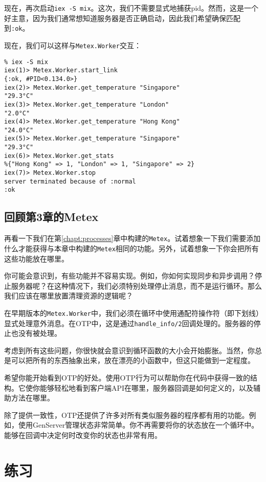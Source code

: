 现在，再次启动\texttt{iex -S mix}。这次，我们不需要显式地捕获pid。然而，这是一个好主意，因为我们通常想知道服务器是否正确启动，因此我们希望确保匹配到\texttt{:ok}。

现在，我们可以这样与\texttt{Metex.Worker}交互：

\begin{code}{}
\begin{verbatim}
% iex -S mix
iex(1)> Metex.Worker.start_link
{:ok, #PID<0.134.0>}
iex(2)> Metex.Worker.get_temperature "Singapore"
"29.3°C"
iex(3)> Metex.Worker.get_temperature "London"
"2.0°C"
iex(4)> Metex.Worker.get_temperature "Hong Kong"
"24.0°C"
iex(5)> Metex.Worker.get_temperature "Singapore"
"29.3°C"
iex(6)> Metex.Worker.get_stats
%{"Hong Kong" => 1, "London" => 1, "Singapore" => 2}
iex(7)> Metex.Worker.stop
server terminated because of :normal
:ok
\end{verbatim}
\end{code}


\subsection{回顾第3章的Metex}

再看一下我们在第\ref{chapt:processes}章中构建的\texttt{Metex}。试着想象一下我们需要添加什么才能获得与本章中构建的\texttt{Metex}相同的功能。另外，试着想象一下你会把所有这些功能放在哪里。

你可能会意识到，有些功能并不容易实现。例如，你如何实现同步和异步调用？停止服务器呢？在这种情况下，我们必须特别处理停止消息，而不是运行循环。那么我们应该在哪里放置清理资源的逻辑呢？

在早期版本的\texttt{Metex.Worker}中，我们必须在循环中使用通配符操作符（即下划线）显式处理意外消息。在OTP中，这是通过\texttt{handle\_info/2}回调处理的。服务器的停止也没有被处理。

考虑到所有这些问题，你很快就会意识到循环函数的大小会开始膨胀。当然，你总是可以把所有的东西抽象出来，放在漂亮的小函数中，但这只能做到一定程度。

希望你能开始看到OTP的好处。使用OTP行为可以帮助你在代码中获得一致的结构。它使你能够轻松地看到客户端API在哪里，服务器回调是如何定义的，以及辅助方法在哪里。

除了提供一致性，OTP还提供了许多对所有类似服务器的程序都有用的功能。例如，使用GenServer管理状态非常简单。你不再需要将你的状态放在一个循环中。能够在回调中决定何时改变你的状态也非常有用。

 \section{练习}

